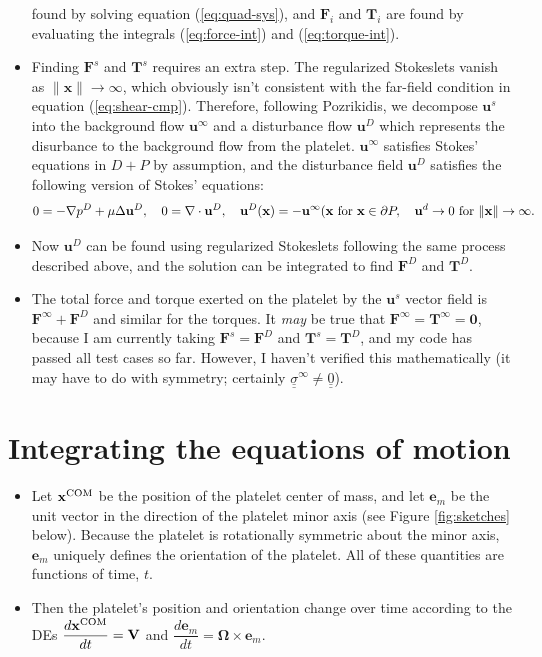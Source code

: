 \documentclass{article}
\newcommand{\tn}{\textnormal}
\newcommand{\vect}[1]{\boldsymbol{\mathbf{#1}}}
\newcommand{\mat}[1]{\underline{\underline{#1}}}
\begin{document}
\begin{itemize}
  found by solving equation (\ref{eq:quad-sys}), and $\vect{F}_i$ and
  $\vect{T}_i$ are found by evaluating the integrals
  (\ref{eq:force-int}) and (\ref{eq:torque-int}).
\item Finding $\vect{F}^s$ and $\vect{T}^s$ requires an extra
  step. The regularized Stokeslets vanish as $\|\vect{x}\| \rightarrow
  \infty$, which obviously isn't consistent with the far-field
  condition in equation (\ref{eq:shear-cmp}). Therefore, following
  Pozrikidis, we decompose $\vect{u}^s$ into the background flow
  $\vect{u}^\infty$ and a disturbance flow $\vect{u}^D$ which
  represents the disurbance to the background flow from the
  platelet. $\vect{u}^\infty$ satisfies Stokes' equations in $D + P$
  by assumption, and the disturbance field $\vect{u}^D$ satisfies the
  following version of Stokes' equations:
  \begin{equation}
    \label{eq:disturb}
    0 = -\nabla p^D + \mu \Delta \vect{u}^D, \quad 0 = \nabla \cdot
    \vect{u}^D, \quad \vect{u}^D(\vect{x}) = -\vect{u}^\infty(\vect{x}
    \tn{ for } \vect{x} \in \partial P, \quad \vect{u}^d \rightarrow 0
    \tn{ for } \|\mathbf{x}\| \rightarrow \infty.
  \end{equation}
\item Now $\vect{u}^D$ can be found using regularized Stokeslets
  following the same process described above, and the solution can be
  integrated to find $\vect{F}^D$ and $\vect{T}^D$.
\item The total force and torque exerted on the platelet by the
  $\vect{u}^s$ vector field is $\vect{F}^\infty + \vect{F}^D$ and
  similar for the torques. It \emph{may} be true that
  $\vect{F}^\infty = \vect{T}^\infty = \vect{0}$, because I am
  currently taking $\vect{F}^s = \vect{F}^D$ and $\vect{T}^s =
  \vect{T}^D$, and my code has passed all test cases so far. However,
  I haven't verified this mathematically (it may have to do with
  symmetry; certainly $\mat{\sigma}^\infty \neq \mat{0}$).
\end{itemize}

\section{Integrating the equations of motion}
\label{sec:integr-equat-moti}

\begin{itemize}
\item Let $\vect{x}^\tn{COM}$ be the position of the platelet center
  of mass, and let $\vect{e}_m$ be the unit vector in the direction of
  the platelet minor axis (see Figure \ref{fig:sketches}
  below). Because the platelet is rotationally symmetric about the
  minor axis, $\vect{e}_m$ uniquely defines the orientation of the
  platelet. All of these quantities are functions of time, $t$.
\item Then the platelet's position and orientation change over time
  according to the DEs $\dfrac{d\vect{x}^\tn{COM}}{dt} = \vect{V}$ and
  $\dfrac{d\vect{e}_m}{dt} = \vect{\Omega} \times \vect{e}_m$.
\end{itemize}
\end{document}

